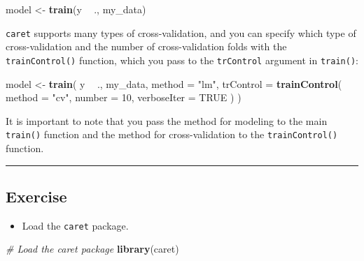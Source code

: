 \documentclass[]{book}
\newenvironment{Shaded}{\begin{snugshade}}{\end{snugshade}}
\newcommand{\KeywordTok}[1]{\textcolor[rgb]{0.13,0.29,0.53}{\textbf{#1}}}
\newcommand{\DataTypeTok}[1]{\textcolor[rgb]{0.13,0.29,0.53}{#1}}
\newcommand{\DecValTok}[1]{\textcolor[rgb]{0.00,0.00,0.81}{#1}}
\newcommand{\StringTok}[1]{\textcolor[rgb]{0.31,0.60,0.02}{#1}}
\newcommand{\CommentTok}[1]{\textcolor[rgb]{0.56,0.35,0.01}{\textit{#1}}}
\newcommand{\OtherTok}[1]{\textcolor[rgb]{0.56,0.35,0.01}{#1}}
\newcommand{\OperatorTok}[1]{\textcolor[rgb]{0.81,0.36,0.00}{\textbf{#1}}}
\newcommand{\NormalTok}[1]{#1}
\providecommand{\tightlist}{%
  \setlength{\itemsep}{0pt}\setlength{\parskip}{0pt}}
\begin{document}
\begin{Shaded}
\begin{Highlighting}[]
\NormalTok{model <-}\StringTok{ }\KeywordTok{train}\NormalTok{(y }\OperatorTok{~}\StringTok{ }\NormalTok{., my_data)}
\end{Highlighting}
\end{Shaded}

\texttt{caret} supports many types of cross-validation, and you can
specify which type of cross-validation and the number of
cross-validation folds with the \texttt{trainControl()} function, which
you pass to the \texttt{trControl} argument in \texttt{train()}:

\begin{Shaded}
\begin{Highlighting}[]
\NormalTok{model <-}\StringTok{ }\KeywordTok{train}\NormalTok{(}
\NormalTok{  y }\OperatorTok{~}\StringTok{ }\NormalTok{., my_data,}
  \DataTypeTok{method =} \StringTok{"lm"}\NormalTok{,}
  \DataTypeTok{trControl =} \KeywordTok{trainControl}\NormalTok{(}
    \DataTypeTok{method =} \StringTok{"cv"}\NormalTok{, }\DataTypeTok{number =} \DecValTok{10}\NormalTok{,}
    \DataTypeTok{verboseIter =} \OtherTok{TRUE}
\NormalTok{  )}
\NormalTok{)}
\end{Highlighting}
\end{Shaded}

It is important to note that you pass the method for modeling to the
main \texttt{train()} function and the method for cross-validation to
the \texttt{trainControl()} function.

\begin{center}\rule{0.5\linewidth}{\linethickness}\end{center}

\subsection*{Exercise}\label{exercise-5}

\begin{itemize}
\tightlist
\item
  Load the \texttt{caret} package.
\end{itemize}

\begin{Shaded}
\begin{Highlighting}[]
\CommentTok{# Load the caret package}
\KeywordTok{library}\NormalTok{(caret)}
\end{Highlighting}
\end{Shaded}
\end{document}
